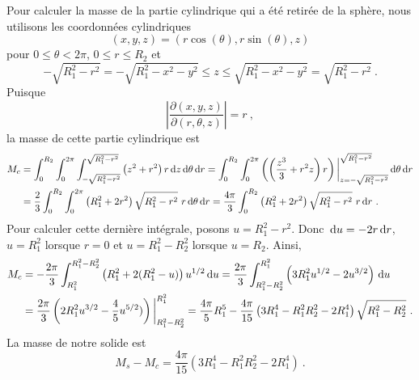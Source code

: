 { Pour calculer la masse de la partie cylindrique qui a été
retirée de la sphère, nous utilisons les coordonnées cylindriques
\[
  (x,y,z) = (r\cos(\theta), r\sin(\theta), z)
\]
pour $0 \leq \theta < 2\pi$, $0 \leq r \leq R_2$ et
\[
-\sqrt{R_1^2-r^2} = -\sqrt{R_1^2 - x^2 - y^2} \leq z \leq
\sqrt{R_1^2 - x^2 - y^2} = \sqrt{R_1^2-r^2} \ .
\]
Puisque
\[
\left| \frac{\partial(x,y,z)}{\partial(r,\theta,z)} \right| = r \ ,
\]
la masse de cette partie cylindrique est
\begin{align*}
M_c &= \int_0^{R_2} \int_0^{2\pi} \int_{-\sqrt{R_1^2-r^2}}^{\sqrt{R_1^2-r^2}}
\left( z^2 + r^2 \right) r \,\mathrm{d}z\,\mathrm{d}\theta\,\mathrm{d}r
= \int_0^{R_2} \int_0^{2\pi} 
\left( \left( \frac{z^3}{3} + r^2 z \right)r \right)
\bigg|_{z=-\sqrt{R_1^2-r^2}}^{\sqrt{R_1^2-r^2}} \,\mathrm{d}\theta\,\mathrm{d}r \\
&= \frac{2}{3} \int_0^{R_2} \int_0^{2\pi} 
\left( R_1^2+2r^2 \right) \sqrt{R_1^2-r^2}\ r \,\mathrm{d}\theta\,\mathrm{d}r
= \frac{4\pi}{3} \int_0^{R_2} \left( R_1^2+2r^2 \right)
\sqrt{R_1^2-r^2}\ r \,\mathrm{d}r \ . 
\end{align*}
Pour calculer cette dernière intégrale, posons $u=R_1^2-r^2$.  Donc
$\,\mathrm{d}u = -2 r\,\mathrm{d}r$, $u= R_1^2$ lorsque $r=0$ et $u=R_1^2-R_2^2$ lorsque
$u=R_2$.  Ainsi,
\begin{align*}
M_c &= -\frac{2\pi}{3} \int_{R_1^2}^{R_1^2-R_2^2}
\left( R_1^2+2 (R_1^2-u) \right) u^{1/2} \,\mathrm{d}u
= \frac{2\pi}{3} \int_{R_1^2-R_2^2}^{R_1^2}
\left( 3 R_1^2 u^{1/2} -2 u^{3/2} \right) \,\mathrm{d}u \\
&= \frac{2\pi}{3} \left( 2 R_1^2 u^{3/2} - \frac{4}{5} u^{5/2})
\right)\bigg|_{R_1^2-R_2^2}^{R_1^2}
= \frac{4\pi}{5} R_1^5
- \frac{4\pi}{15}\left( 3 R_1^4 - R_1^2 R_2^2 - 2 R_1^4\right)
\sqrt{R_1^2-R_2^2} \ .
\end{align*}
La masse de notre solide est
\[
M_s-M_c = \frac{4\pi}{15}\left( 3 R_1^4 - R_1^2 R_2^2 - 2 R_1^4\right) \ .
\]
}

